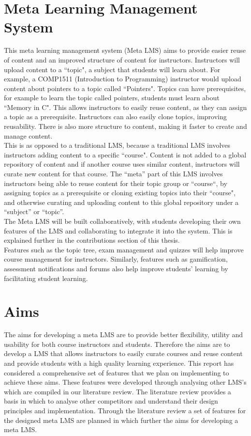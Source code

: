 \section{Meta Learning Management System}
This meta learning management system (Meta LMS) aims to provide easier reuse of content and an improved structure of content for instructors. Instructors will upload content to a ``topic", a subject that students will learn about. For example, a COMP1511 (Introduction to Programming) instructor would upload content about pointers to a topic called ``Pointers". Topics can have prerequisites, for example to learn the topic called pointers, students must learn about ``Memory in C". This allows instructors to easily reuse content, as they can assign a topic as a prerequisite. Instructors can also easily clone topics, improving reusability. There is also more structure to content, making it faster to create and manage content.\\

This is as opposed to a traditional LMS, because a traditional LMS involves instructors adding content to a specific ``course". Content is not added to a global repository of content and if another course uses similar content, instructors will curate new content for that course. The ``meta'' part of this LMS involves instructors being able to reuse content for their topic group or ``course``, by assigning topics as a prerequisite or cloning existing topics into their ``course", and otherwise curating and uploading content to this global repository under a ``subject'' or ``topic''.\\

The Meta LMS will be built collaboratively, with students developing their own features of the LMS and collaborating to integrate it into the system. This is explained further in the contributions section of this thesis.\\
Features such as the topic tree, exam management and quizzes will help improve course management for instructors. Similarly, features such as gamification, assessment notifications and forums also help improve students' learning by facilitating student learning.\\

\section{Aims}
The aims for developing a meta LMS are to provide better flexibility, utility and usability for both course instructors and students. 
Therefore the aims are to develop a LMS that allows instructors to easily curate courses and reuse content and provide students with a high quality learning experience. 
This report has considered a comprehensive set of features that we plan on implementing to achieve these aims. 
These features were developed through analysing other LMS’s which are compiled in our literature review.
The literature review provides a basis in which to analyse other competitors and understand their design principles and implementation.
Through the literature review a set of features for the designed meta LMS are planned in which further the aims for developing a meta LMS.

